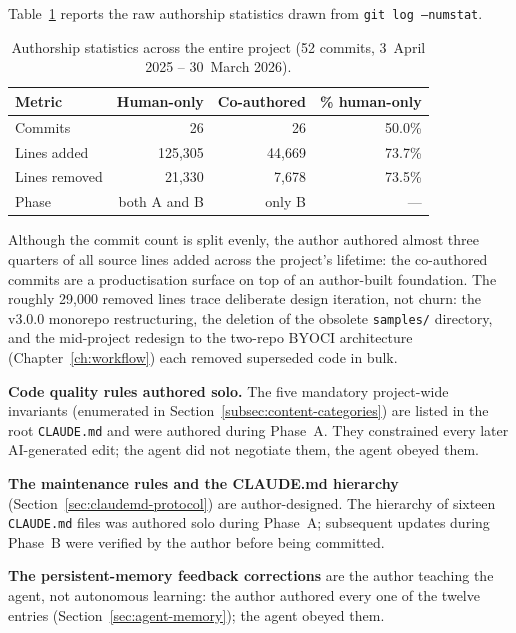 Table~\ref{tab:authorship-stats} reports the raw authorship statistics drawn from \texttt{git log --numstat}.

\begin{table}[htbp]
\centering
\caption{Authorship statistics across the entire project (52 commits, 3~April 2025 -- 30~March 2026).}
\label{tab:authorship-stats}
\small
\begin{tabular}{@{}lrrr@{}}
\toprule
\textbf{Metric} & \textbf{Human-only} & \textbf{Co-authored} & \textbf{\% human-only} \\
\midrule
Commits                 & 26      & 26     & 50.0\% \\
Lines added             & 125{,}305 & 44{,}669 & 73.7\% \\
Lines removed           &  21{,}330 &  7{,}678 & 73.5\% \\
Phase                   & both A and B & only B & --- \\
\bottomrule
\end{tabular}
\end{table}

Although the commit count is split evenly, the author authored almost three quarters of all source lines added across the project's lifetime: the co-authored commits are a productisation surface on top of an author-built foundation. The roughly 29{,}000 removed lines trace deliberate design iteration, not churn: the v3.0.0 monorepo restructuring, the deletion of the obsolete \texttt{samples/} directory, and the mid-project redesign to the two-repo BYOCI architecture (Chapter~\ref{ch:workflow}) each removed superseded code in bulk.

\textbf{Code quality rules authored solo.} The five mandatory project-wide invariants (enumerated in Section~\ref{subsec:content-categories}) are listed in the root \texttt{CLAUDE.md} and were authored during Phase~A. They constrained every later AI-generated edit; the agent did not negotiate them, the agent obeyed them.

\textbf{The maintenance rules and the CLAUDE.md hierarchy} (Section~\ref{sec:claudemd-protocol}) are author-designed. The hierarchy of sixteen \texttt{CLAUDE.md} files was authored solo during Phase~A; subsequent updates during Phase~B were verified by the author before being committed.

\textbf{The persistent-memory feedback corrections} are the author teaching the agent, not autonomous learning: the author authored every one of the twelve entries (Section~\ref{sec:agent-memory}); the agent obeyed them.

